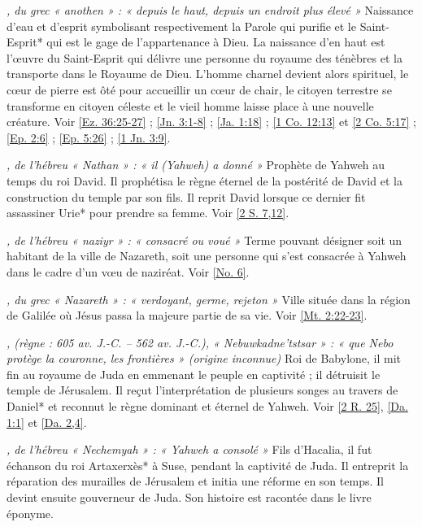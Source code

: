 \begin{multicols}{2}
\textit{, du grec « anothen » : « depuis le haut, depuis un endroit plus élevé »}\newline
Naissance d'eau et d'esprit symbolisant respectivement la Parole qui purifie et le Saint-Esprit* qui est le gage de l'appartenance à Dieu. La naissance d'en haut est l'œuvre du Saint-Esprit qui délivre une personne du royaume des ténèbres et la transporte dans le Royaume de Dieu. L'homme charnel devient alors spirituel, le cœur de pierre est ôté pour accueillir un cœur de chair, le citoyen terrestre se transforme en citoyen céleste et le vieil homme laisse place à une nouvelle créature. Voir \vref{Ez. 36:25-27} ; \vref{Jn. 3:1-8} ; \vref{Ja. 1:18} ; \vref{1 Co. 12:13} et \vref{2 Co. 5:17} ; \vref{Ep. 2:6} ; \vref{Ep. 5:26} ; \vref{1 Jn. 3:9}.

\textit{, de l'hébreu « Nathan » : « il (Yahweh) a donné »}\newline
Prophète de Yahweh au temps du roi David. Il prophétisa le règne éternel de la postérité de David et la construction du temple par son fils. Il reprit David lorsque ce dernier fit assassiner Urie* pour prendre sa femme. Voir \vref{2 S. 7,12}.

\textit{, de l'hébreu « naziyr » : « consacré ou voué »}\newline
Terme pouvant désigner soit un habitant de la ville de Nazareth, soit une personne qui s'est consacrée à Yahweh dans le cadre d'un vœu de naziréat. Voir \vref{No. 6}.

\textit{, du grec « Nazareth » : « verdoyant, germe, rejeton »}\newline
Ville située dans la région de Galilée où Jésus passa la majeure partie de sa vie. Voir \vref{Mt. 2:22-23}.

\textit{, (règne : 605 av. J.-C. – 562 av. J.-C.), « Nebuwkadne'tstsar » : « que Nebo protège la couronne, les frontières » (origine inconnue)}\newline
Roi de Babylone, il mit fin au royaume de Juda en emmenant le peuple en captivité ; il détruisit le temple de Jérusalem. Il reçut l'interprétation de plusieurs songes au travers de Daniel* et reconnut le règne dominant et éternel de Yahweh. Voir \vref{2 R. 25}, \vref{Da. 1:1} et \vref{Da. 2,4}.

\textit{, de l'hébreu « Nechemyah » : « Yahweh a consolé »}\newline
Fils d'Hacalia, il fut échanson du roi Artaxerxès* à Suse, pendant la captivité de Juda. Il entreprit la réparation des murailles de Jérusalem et initia une réforme en son temps. Il devint ensuite gouverneur de Juda. Son histoire est racontée dans le livre éponyme.


\end{multicols}
